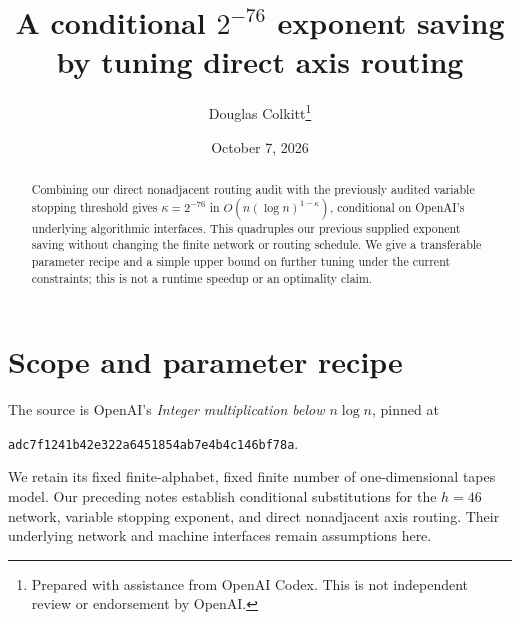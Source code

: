 \documentclass[11pt]{article}
\title{A conditional $2^{-76}$ exponent saving by tuning direct axis routing}
\author{Douglas Colkitt\thanks{Prepared with assistance from OpenAI Codex. This is not independent review or endorsement by OpenAI.}}
\date{October 7, 2026}
\begin{document}
\maketitle
\begin{abstract}
Combining our direct nonadjacent routing audit with the previously audited
variable stopping threshold gives $\kappa=2^{-76}$ in
$O(n(\log n)^{1-\kappa})$, conditional on OpenAI's underlying algorithmic
interfaces. This quadruples our previous supplied exponent saving without
changing the finite network or routing schedule. We give a transferable
parameter recipe and a simple upper bound on further tuning under the
current constraints; this is not a runtime speedup or an optimality claim.
\end{abstract}

\section{Scope and parameter recipe}
The source is OpenAI's \emph{Integer multiplication below $n\log n$}, pinned at
\begin{center}\texttt{adc7f1241b42e322a6451854ab7e4b4c146bf78a}.\end{center}
We retain its fixed finite-alphabet, fixed finite number of one-dimensional
tapes model. Our preceding notes establish conditional substitutions for the
$h=46$ network, variable stopping exponent, and direct nonadjacent axis routing.
Their underlying network and machine interfaces remain assumptions here.
\end{document}
